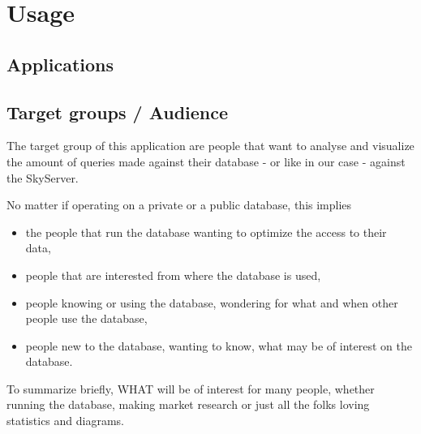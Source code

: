 \section{Usage}
\subsection{Applications}


%



\subsection{Target groups / Audience}

The target group of this application are people that want to analyse 
and visualize the amount of queries made against their database - or like
in our case - against the SkyServer.

No matter if operating on a private or a public database, this implies
\begin{itemize}
  \item the people that run the database wanting to optimize the access to
  	their data,
  	
  \item people that are interested from where the database is used,

  \item people knowing or using the database, wondering for what and when other people
  use the database,
  
  \item people new to the database, wanting to know, what may be of interest
  on the database.

\end{itemize}
To summarize briefly, WHAT will be of interest for many people, 
whether running the database, making market research or just all the folks
loving statistics and diagrams.

